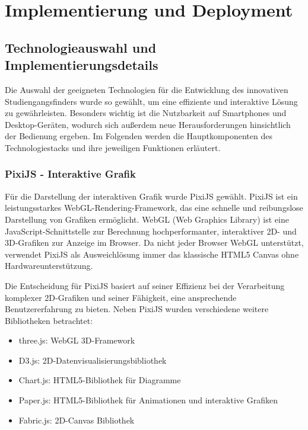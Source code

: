 \section{Implementierung und Deployment}\label{sec:implementierung-und-deployment}
\subsection{Technologieauswahl und Implementierungsdetails}
Die Auswahl der geeigneten Technologien für die Entwicklung des innovativen 
Studiengangsfinders wurde so gewählt, um eine effiziente und interaktive Lösung
zu gewährleisten. Besonders wichtig ist die Nutzbarkeit auf
Smartphones und Desktop-Geräten, wodurch sich außerdem neue Herausforderungen
hinsichtlich der Bedienung ergeben. Im Folgenden werden die Hauptkomponenten des
Technologiestacks und ihre jeweiligen Funktionen erläutert.

\subsubsection{PixiJS - Interaktive Grafik}
Für die Darstellung der interaktiven Grafik wurde PixiJS gewählt. PixiJS ist ein leistungsstarkes WebGL-Rendering-Framework, das eine schnelle und reibungslose Darstellung von Grafiken ermöglicht. \parencite{pixijs_pixijs_2023} WebGL (Web Graphics Library) ist eine JavaScript-Schnittstelle zur Berechnung hochperformanter, interaktiver 2D- und 3D-Grafiken zur Anzeige im Browser. \parencite{mozilla_corporation_webgl_2023} Da nicht jeder Browser WebGL unterstützt, verwendet PixiJS als Ausweichlösung immer das klassische HTML5 Canvas ohne Hardwareunterstützung. \parencite{pixijs_pixijs_2024}

Die Entscheidung für PixiJS basiert auf seiner Effizienz bei der Verarbeitung komplexer 2D-Grafiken und seiner Fähigkeit, eine ansprechende Benutzererfahrung zu bieten. Neben PixiJS wurden verschiedene weitere Bibliotheken betrachtet:
\begin{itemize}
    \item three.js: WebGL 3D-Framework
    \item D3.js: 2D-Datenvisualisierungsbibliothek
    \item Chart.js: HTML5-Bibliothek für Diagramme
    \item Paper.js: HTML5-Bibliothek für Animationen und interaktive Grafiken
    \item Fabric.js: 2D-Canvas Bibliothek
\end{itemize}

